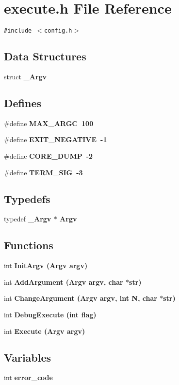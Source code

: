 \section{execute.h File Reference}
\label{execute_8h}
{\tt \#include $<$config.h$>$}\par
\subsection*{Data Structures}
\begin{CompactItemize}
\item 
struct \bf{\_\-Argv}
\end{CompactItemize}
\subsection*{Defines}
\begin{CompactItemize}
\item 
\#define \bf{MAX\_\-ARGC}~100
\item 
\#define \bf{EXIT\_\-NEGATIVE}~-1
\item 
\#define \bf{CORE\_\-DUMP}~-2
\item 
\#define \bf{TERM\_\-SIG}~-3
\end{CompactItemize}
\subsection*{Typedefs}
\begin{CompactItemize}
\item 
typedef \bf{\_\-Argv} $\ast$ \bf{Argv}
\end{CompactItemize}
\subsection*{Functions}
\begin{CompactItemize}
\item 
int \bf{Init\-Argv} (\bf{Argv} argv)
\item 
int \bf{Add\-Argument} (\bf{Argv} argv, char $\ast$str)
\item 
int \bf{Change\-Argument} (\bf{Argv} argv, int N, char $\ast$str)
\item 
int \bf{Debug\-Execute} (int flag)
\item 
int \bf{Execute} (\bf{Argv} argv)
\end{CompactItemize}
\subsection*{Variables}
\begin{CompactItemize}
\item 
int \bf{error\_\-code}
\end{CompactItemize}


